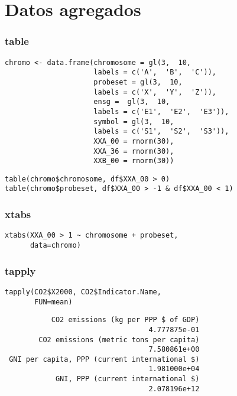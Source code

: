 \documentclass[xcolor={usenames,svgnames,dvipsnames}]{beamer}
\begin{document}
\section{Datos agregados}
\label{sec-3}
\begin{frame}[fragile]
\frametitle{table}
\label{sec-3-1}


\lstset{language=R}
\begin{lstlisting}
chromo <- data.frame(chromosome = gl(3,  10,
                     labels = c('A',  'B',  'C')),
                     probeset = gl(3,  10,
                     labels = c('X',  'Y',  'Z')),
                     ensg =  gl(3,  10,
                     labels = c('E1',  'E2',  'E3')),
                     symbol = gl(3,  10,
                     labels = c('S1',  'S2',  'S3')),
                     XXA_00 = rnorm(30),
                     XXA_36 = rnorm(30),
                     XXB_00 = rnorm(30))
\end{lstlisting}


\lstset{language=R}
\begin{lstlisting}
table(chromo$chromosome, df$XXA_00 > 0)
table(chromo$probeset, df$XXA_00 > -1 & df$XXA_00 < 1)
\end{lstlisting}
\end{frame}
\begin{frame}[fragile]
\frametitle{xtabs}
\label{sec-3-2}


\lstset{language=R}
\begin{lstlisting}
xtabs(XXA_00 > 1 ~ chromosome + probeset,
      data=chromo)
\end{lstlisting}
\end{frame}
\begin{frame}[fragile]
\frametitle{tapply}
\label{sec-3-3}


\lstset{language=R}
\begin{lstlisting}
tapply(CO2$X2000, CO2$Indicator.Name,
       FUN=mean)
\end{lstlisting}

\begin{verbatim}
           CO2 emissions (kg per PPP $ of GDP) 
                                  4.777875e-01 
        CO2 emissions (metric tons per capita) 
                                  7.580861e+00 
 GNI per capita, PPP (current international $) 
                                  1.981000e+04 
            GNI, PPP (current international $) 
                                  2.078196e+12
\end{verbatim}
\end{frame}
\end{document}
